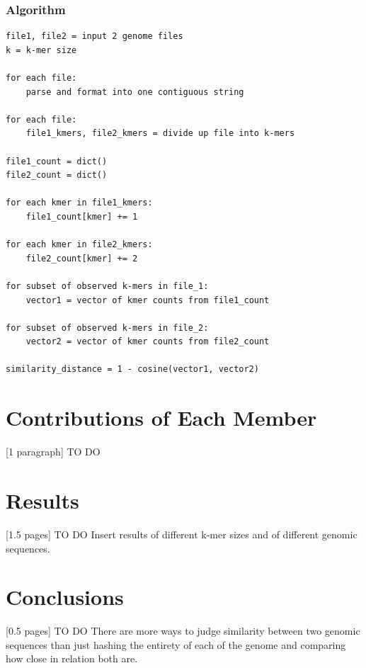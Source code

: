 \documentclass[12pt, letterpaper]{article}
\begin{document}
\subsubsection{Algorithm}
\begin{verbatim}
file1, file2 = input 2 genome files 
k = k-mer size

for each file:
    parse and format into one contiguous string

for each file:
    file1_kmers, file2_kmers = divide up file into k-mers

file1_count = dict()
file2_count = dict()

for each kmer in file1_kmers:
    file1_count[kmer] += 1

for each kmer in file2_kmers:
    file2_count[kmer] += 2

for subset of observed k-mers in file_1:
    vector1 = vector of kmer counts from file1_count

for subset of observed k-mers in file_2:
    vector2 = vector of kmer counts from file2_count

similarity_distance = 1 - cosine(vector1, vector2)
\end{verbatim}




\section{Contributions of Each Member}
[1 paragraph] \color{red} TO DO \color{black}

\section{Results}
[1.5 pages] \color{red} TO DO \color{black} Insert results of different k-mer sizes and of different genomic sequences.

\section{Conclusions}
[0.5 pages] \color{red} TO DO \color{black} There are more ways to judge similarity between two genomic sequences than just hashing the entirety of each of the genome and comparing how close in relation both are.
\end{document}
